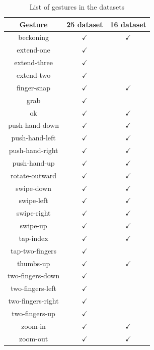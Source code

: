 \begin{table}
  \centering
  \begin{tabular}{c|c|c}
Gesture & 25 dataset & 16 dataset\\
\hline
beckoning & \(\checkmark\) & \(\checkmark\)\\
extend-one & \(\checkmark\) & \\
extend-three & \(\checkmark\) & \\
extend-two & \(\checkmark\) & \\
finger-snap & \(\checkmark\) & \(\checkmark\)\\
grab & \(\checkmark\) & \\
ok & \(\checkmark\) & \(\checkmark\)\\
push-hand-down & \(\checkmark\) & \(\checkmark\)\\
push-hand-left & \(\checkmark\) & \(\checkmark\)\\
push-hand-right & \(\checkmark\) & \(\checkmark\)\\
push-hand-up & \(\checkmark\) & \(\checkmark\)\\
rotate-outward & \(\checkmark\) & \(\checkmark\)\\
swipe-down & \(\checkmark\) & \(\checkmark\)\\
swipe-left & \(\checkmark\) & \(\checkmark\)\\
swipe-right & \(\checkmark\) & \(\checkmark\)\\
swipe-up & \(\checkmark\) & \(\checkmark\)\\
tap-index & \(\checkmark\) & \(\checkmark\)\\
tap-two-fingers & \(\checkmark\) & \\
thumbs-up & \(\checkmark\) & \(\checkmark\)\\
two-fingers-down & \(\checkmark\) & \\
two-fingers-left & \(\checkmark\) & \\
two-fingers-right & \(\checkmark\) & \\
two-fingers-up & \(\checkmark\) & \\
zoom-in & \(\checkmark\) & \(\checkmark\)\\
zoom-out & \(\checkmark\) & \(\checkmark\)\\
  \end{tabular}
  \caption{List of gestures in the datasets}
  \label{tab:gestures}
\end{table}
